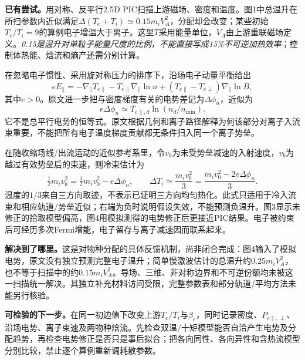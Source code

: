 \textbf{已有尝试。}\citet{Haggerty2015Partition}用对称、反平行2.5D PIC扫描上游磁场、密度和温度。图1中总温升在所扫参数内近似满足$\Delta(T_e+T_i)\simeq0.15m_iV_A^2$，分配却会改变；某些初始$T_e/T_i=9$的算例电子增温大于离子。这里$T$采用能量单位，$V_A$由上游重联磁场定义。\emph{0.15是温升对单粒子能量尺度的比例，不能直接写成15\%不可逆加热效率}；控制体热能、焓流和熵产还需分别计算。\citep{Haggerty2015Partition}

在忽略电子惯性、采用旋对称压力的排序下，沿场电子动量平衡给出
\begin{equation}
 eE_\parallel=-\nabla_\parallel T_{e\parallel}
 -T_{e\parallel}\nabla_\parallel\ln n
 +(T_{e\parallel}-T_{e\perp})\nabla_\parallel\ln B,
 \label{eq:question-epar}
\end{equation}
其中$e>0$。原文进一步把与密度梯度有关的电势差记为$\Delta\phi_n$，近似为
\begin{equation}
 e\Delta\phi_n\simeq T_{e\parallel,d}\ln(n_d/n_{\min}).
\end{equation}
它不是总平行电势的恒等式。原文根据几何和离子路径解释为何该部分对离子入流束重要，不能把所有电子温度梯度贡献都无条件归入同一个离子势垒。

在随收缩场线/出流运动的近似参考系里，令$v_0$为未受势垒减速的入射速度，$v_b$为越过有效势垒后的束速，则冷束估计为
\begin{equation}
 \tfrac12m_iv_b^2=\tfrac12m_iv_0^2-e\Delta\phi_n,
 \qquad
 \Delta T_i\simeq\frac{m_iv_b^2}{3}
 =\frac{m_iv_0^2-2e\Delta\phi_n}{3}.
 \label{eq:question-partition}
\end{equation}
温度的$1/3$来自三方向取迹，不表示已证明三方向均匀热化。此式只适用于冷入流束和相应轨道/势垒近似；右端为负时说明假设失效，不能预测负温升。图3显示未修正的拾取模型偏高，图4用模拟测得的电势修正后更接近PIC结果。电子被约束后可经历多次Fermi增能，电子留存与离子减速因而联系起来。

\textbf{解决到了哪里。}这是对物种分配的具体反馈机制，尚非闭合完成：图4输入了模拟电势，原文没有独立预测完整电子温升；简单慢激波估计的总温升约$0.25m_iV_A^2$，也不等于扫描中的约$0.15m_iV_A^2$。导场、三维、非对称边界和不可逆份额均未被这一扫描统一解决。其独立补充材料访问受限，完整参数表和部分轨道/平均方法未能另行核验。

\textbf{可检验的下一步。}在同一初边值下改变上游$T_e/T_i$与$\beta_e$，同时记录密度、$P_{e\parallel,\perp}$、沿场电势、离子束速及两物种焓流。先检查双温/十矩模型能否自洽产生电势及分配趋势，再检查电势修正是否只是事后拟合；把各向同性、各向异性和含热流模型分别比较，禁止逐个算例重新调耗散参数。


